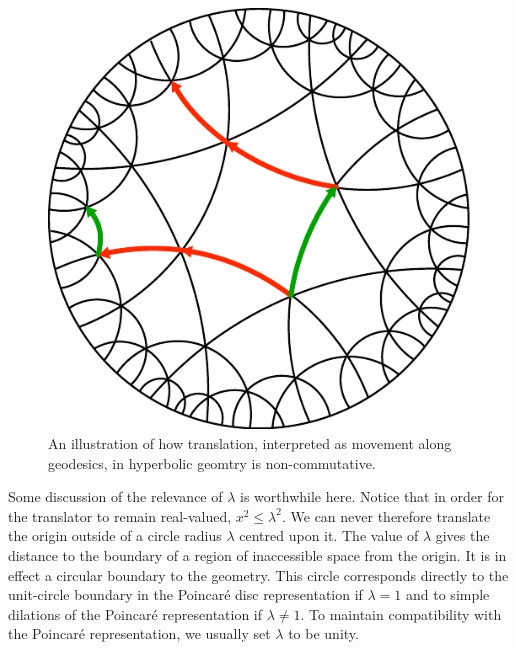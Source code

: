 \begin{figure} \centering
\includegraphics[width=0.9\columnwidth]{circlimitgrid}
\caption{An illustration of how translation, interpreted as movement along
geodesics, in hyperbolic geomtry is non-commutative.
\label{fig:limitgrid}}
\end{figure}

Some discussion of the relevance of $\lambda$ is worthwhile here. Notice that
in order for the translator to remain real-valued, $x^2 \le \lambda^2$. 
We can never therefore translate the origin outside of a circle radius
$\lambda$ centred upon it. The value of $\lambda$ gives the distance to
the boundary of a region of inaccessible space from the origin. It is
in effect a circular boundary to the geometry. This circle corresponds
directly to the unit-circle boundary in the Poincar\'e disc representation if
$\lambda = 1$ and to simple dilations of the Poincar\'e representation if
$\lambda \ne 1$. To maintain compatibility with the Poincar\'e representation,
we usually set $\lambda$ to be unity.

